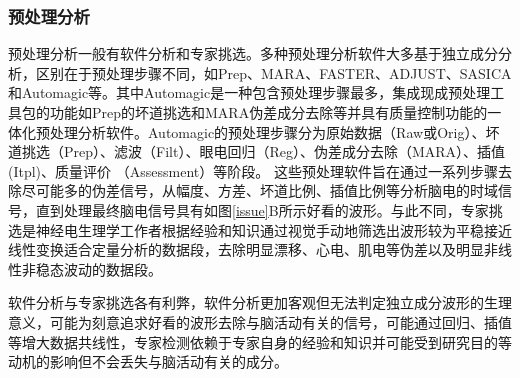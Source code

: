 \subsubsection{预处理分析}
预处理分析一般有软件分析和专家挑选。多种预处理分析软件大多基于独立成分分析，区别在于预处理步骤不同，如Prep、MARA、FASTER、ADJUST、SASICA和Automagic等。其中Automagic是一种包含预处理步骤最多，集成现成预处理工具包的功能如Prep的坏道挑选和MARA伪差成分去除等并具有质量控制功能的一体化预处理分析软件。Automagic的预处理步骤分为原始数据（Raw或Orig）、坏道挑选（Prep）、滤波（Filt）、眼电回归（Reg）、伪差成分去除（MARA）、插值(Itpl)、质量评价
（Assessment）等阶段。 这些预处理软件旨在通过一系列步骤去除尽可能多的伪差信号，从幅度、方差、坏道比例、插值比例等分析脑电的时域信号，直到处理最终脑电信号具有如图\ref{issue}B所示好看的波形。与此不同，专家挑选是神经电生理学工作者根据经验和知识通过视觉手动地筛选出波形较为平稳接近线性变换适合定量分析的数据段，去除明显漂移、心电、肌电等伪差以及明显非线性非稳态波动的数据段。

软件分析与专家挑选各有利弊，软件分析更加客观但无法判定独立成分波形的生理意义，可能为刻意追求好看的波形去除与脑活动有关的信号，可能通过回归、插值等增大数据共线性，专家检测依赖于专家自身的经验和知识并可能受到研究目的等动机的影响但不会丢失与脑活动有关的成分。

